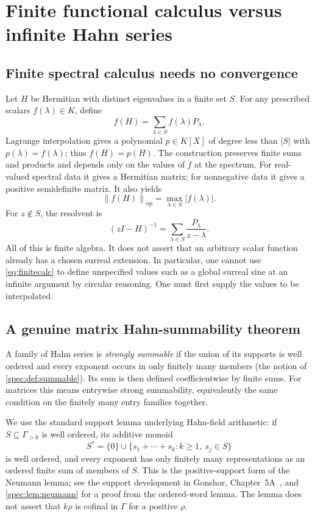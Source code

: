 \documentclass[11pt,a4paper]{article}
\numberwithin{equation}{section}
\theoremstyle{definition}
\theoremstyle{remark}
\newcommand{\op}{\mathrm{op}}
\newcommand{\norm}[1]{\left\lVert#1\right\rVert}
\begin{document}
\section{Finite functional calculus versus infinite Hahn series}\label{sec:functions}

\subsection{Finite spectral calculus needs no convergence}
Let $H$ be Hermitian with distinct eigenvalues in a finite set $S$. For
any prescribed scalars $f(\lambda)\in K$, define
\begin{equation}\label{eq:finitecalc}
 f(H)=\sum_{\lambda\in S}f(\lambda)P_\lambda.
\end{equation}
Lagrange interpolation gives a polynomial $p\in K[X]$ of degree less than
$|S|$ with $p(\lambda)=f(\lambda)$; thus $f(H)=p(H)$. The construction
preserves finite sums and products and depends only on the values of $f$
at the spectrum. For real-valued spectral data it gives a Hermitian matrix;
for nonnegative data it gives a positive semidefinite matrix. It also yields
\[
 \norm{f(H)}_{\op}=\max_{\lambda\in S}|f(\lambda)|.
\]
For $z\notin S$, the resolvent is
\[
 (zI-H)^{-1}=\sum_{\lambda\in S}\frac{P_\lambda}{z-\lambda}.
\]
All of this is finite algebra. It does not assert that an arbitrary scalar
function already has a chosen surreal extension. In particular, one cannot
use \eqref{eq:finitecalc} to define unspecified values such as a global
surreal sine at an infinite argument by circular reasoning. One must first
supply the values to be interpolated.

\subsection{A genuine matrix Hahn-summability theorem}
A family of Hahn series is \emph{strongly summable} if the union of its
supports is well ordered and every exponent occurs in only finitely many
members (the notion of \cref{spec:def:summable}). Its sum is then defined
coefficientwise by finite sums. For matrices this means entrywise strong
summability, equivalently the same condition on the finitely many entry
families together.

We use the standard support lemma underlying Hahn-field arithmetic: if
$S\subseteq\Gamma_{>0}$ is well ordered, its additive monoid
\[
 S^*=\{0\}\cup\{s_1+\cdots+s_k:k\ge1,\ s_j\in S\}
\]
is well ordered, and every exponent has only finitely many representations
as an ordered finite sum of members of $S$. This is the positive-support
form of the Neumann lemma; see the support development in Gonshor,
Chapter~5A~\cite{Gonshor}, and \cref{spec:lem:neumann} for a proof from the
ordered-word lemma. The lemma does not assert that $k\rho$ is cofinal in
$\Gamma$ for a positive $\rho$.
\end{document}
